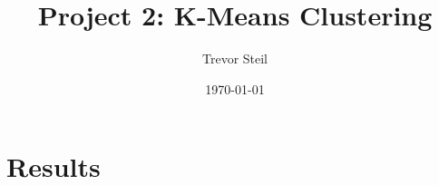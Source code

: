 \documentclass[11pt]{article}
\title{Project 2: K-Means Clustering }
\date{\today}
\author{Trevor Steil}
\begin{document}
\maketitle

\section{Results}
\end{document}
